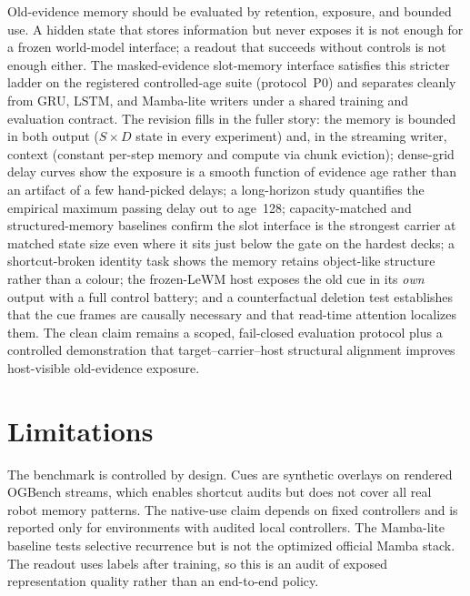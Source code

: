 Old-evidence memory should be evaluated by retention, exposure, and bounded use.
A hidden state that stores information but never exposes it is not enough for a
frozen world-model interface; a readout that succeeds without controls is not
enough either.  The masked-evidence slot-memory interface satisfies this stricter
ladder on the registered controlled-age suite (protocol~P0) and separates
cleanly from GRU, LSTM, and Mamba-lite writers under a shared training and
evaluation contract.  The revision fills in the fuller story: the memory is
bounded in both output ($S\times D$ state in every experiment) and, in the
streaming writer, context (constant per-step memory and compute via chunk
eviction); dense-grid delay curves show the exposure is a smooth function of
evidence age rather than an artifact of a few hand-picked delays; a long-horizon study
quantifies the empirical maximum passing delay out to age~128; capacity-matched
and structured-memory baselines confirm the slot interface is the strongest
carrier at matched state size even where it sits just below the gate on the
hardest decks; a shortcut-broken identity task shows the memory retains
object-like structure rather than a colour; the frozen-LeWM host exposes the
old cue in its \emph{own} output with a full control battery; and a
counterfactual deletion test establishes that the cue frames are causally
necessary and that read-time attention localizes them.  The clean claim remains
a scoped, fail-closed evaluation protocol plus a controlled demonstration that
target--carrier--host structural alignment improves host-visible old-evidence
exposure.

\section{Limitations}

The benchmark is controlled by design.  Cues are synthetic overlays on rendered
OGBench streams, which enables shortcut audits but does not cover all real robot
memory patterns.  The native-use claim depends on fixed controllers and is
reported only for environments with audited local controllers.  The Mamba-lite
baseline tests selective recurrence but is not the optimized official Mamba
stack.  The readout uses labels after training, so this is an audit of exposed
representation quality rather than an end-to-end policy.

